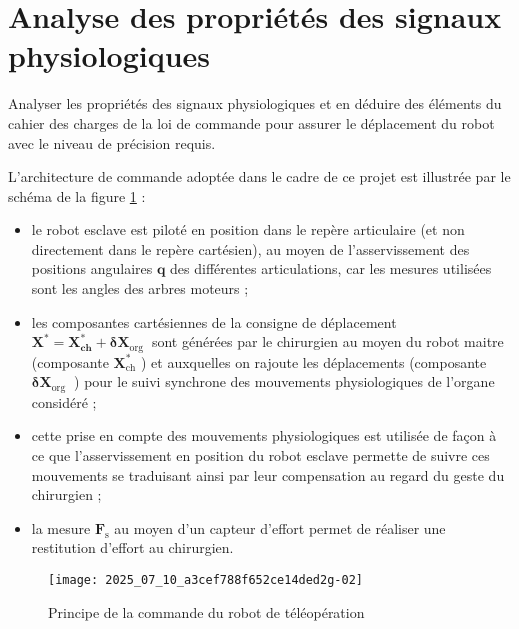 \section{Analyse des propriétés des signaux physiologiques}

\begin{obj}
Analyser les propriétés des signaux physiologiques et en déduire des éléments du cahier des charges de la loi de commande pour assurer le déplacement du robot avec le niveau de précision requis.
\end{obj}

\ifprof
\else
L'architecture de commande adoptée dans le cadre de ce projet est illustrée par le schéma de la figure \ref{ccs_psi_2019_fig_02} :

\begin{itemize}
  \item le robot esclave est piloté en position dans le repère articulaire (et non directement dans le repère cartésien), au moyen de l'asservissement des positions angulaires $\mathbf{q}$ des différentes articulations, car les mesures utilisées sont les angles des arbres moteurs ;
  \item les composantes cartésiennes de la consigne de déplacement $\mathbf{X}^{*}=\mathbf{X}_{\mathbf{c h}}^{*}+\boldsymbol{\delta} \mathbf{X}_{\text {org }}$ sont générées par le chirurgien au moyen du robot maitre (composante $\mathbf{X}_{\mathrm{ch}}^{*}$ ) et auxquelles on rajoute les déplacements (composante $\boldsymbol{\delta} \mathbf{X}_{\text {org }}$ ) pour le suivi synchrone des mouvements physiologiques de l'organe considéré ;
  \item cette prise en compte des mouvements physiologiques est utilisée de façon à ce que l'asservissement en position du robot esclave permette de suivre ces mouvements se traduisant ainsi par leur compensation au regard du geste du chirurgien ;
  \item la mesure $\mathbf{F}_{\mathrm{s}}$ au moyen d'un capteur d'effort permet de réaliser une restitution d'effort au chirurgien.
\end{itemize}


\begin{figure}[!h]
\centering
\texttt{[image: 2025\_07\_10\_a3cef788f652ce14ded2g-02]}

\caption{Principe de la commande du robot de téléopération\label{ccs_psi_2019_fig_02}}
\end{figure}



